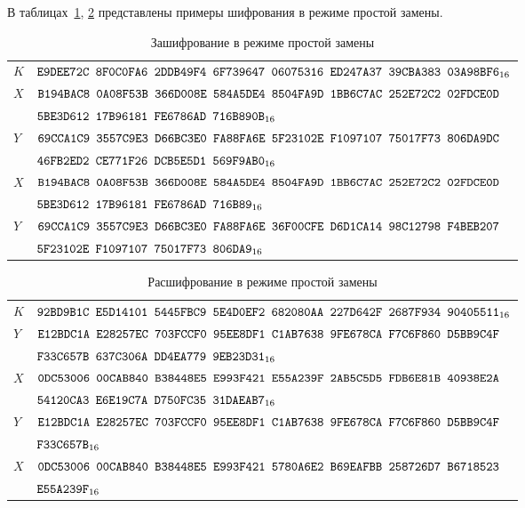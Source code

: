 \label{TEST.ECB}

В таблицах~\ref{Table.TEST.ECBE}, \ref{Table.TEST.ECBD} 
представлены примеры шифрования в режиме простой замены. 

\begin{table}[H]
\caption{Зашифрование в режиме простой замены}\label{Table.TEST.ECBE}
\begin{tabular}{|l|l|}
\hline
$K$ & 
$\texttt{E9DEE72C~8F0C0FA6~2DDB49F4~6F739647~06075316~ED247A37~39CBA383~03A98BF6}_{16}$\\
\ddhline
$X$ &
$\texttt{B194BAC8~0A08F53B~366D008E~584A5DE4~8504FA9D~1BB6C7AC~252E72C2~02FDCE0D}$\\
&
$\texttt{5BE3D612~17B96181~FE6786AD~716B890B}_{16}$\\
\dhline
$Y$ &
$\texttt{69CCA1C9~3557C9E3~D66BC3E0~FA88FA6E~5F23102E~F1097107~75017F73~806DA9DC}$\\
&
$\texttt{46FB2ED2~CE771F26~DCB5E5D1~569F9AB0}_{16}$\\
\ddhline
$X$ &
$\texttt{B194BAC8~0A08F53B~366D008E~584A5DE4~8504FA9D~1BB6C7AC~252E72C2~02FDCE0D}$\\
&
$\texttt{5BE3D612~17B96181~FE6786AD~716B89}_{16}$\\
\dhline
$Y$ &
$\texttt{69CCA1C9~3557C9E3~D66BC3E0~FA88FA6E~36F00CFE~D6D1CA14~98C12798~F4BEB207}$\\
&
$\texttt{5F23102E~F1097107~75017F73~806DA9}_{16}$\\
\hline
\end{tabular}
\end{table}

\begin{table}[H]
\caption{Расшифрование в режиме простой замены}\label{Table.TEST.ECBD}
\begin{tabular}{|l|l|}
\hline
$K$ & 
$\texttt{92BD9B1C~E5D14101~5445FBC9~5E4D0EF2~682080AA~227D642F~2687F934~90405511}_{16}$\\
\ddhline
$Y$ &
$\texttt{E12BDC1A~E28257EC~703FCCF0~95EE8DF1~C1AB7638~9FE678CA~F7C6F860~D5BB9C4F}$\\
& 
$\texttt{F33C657B~637C306A~DD4EA779~9EB23D31}_{16}$\\
\dhline
$X$ &
$\texttt{0DC53006~00CAB840~B38448E5~E993F421~E55A239F~2AB5C5D5~FDB6E81B~40938E2A}$\\
&
$\texttt{54120CA3~E6E19C7A~D750FC35~31DAEAB7}_{16}$\\
\ddhline
$Y$ &
$\texttt{E12BDC1A~E28257EC~703FCCF0~95EE8DF1~C1AB7638~9FE678CA~F7C6F860~D5BB9C4F}$\\
& 
$\texttt{F33C657B}_{16}$\\
\dhline
$X$ &
$\texttt{0DC53006~00CAB840~B38448E5~E993F421~5780A6E2~B69EAFBB~258726D7~B6718523}$\\
&
$\texttt{E55A239F}_{16}$\\
\hline
\end{tabular}
\end{table}
